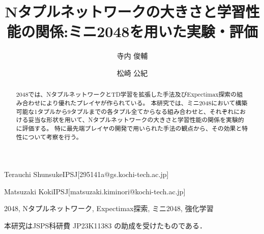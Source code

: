 \documentclass[submit,techrep,noauthor,platex,dvipdfmx]{ipsj}
\begin{document}
\title{Nタプルネットワークの大きさと学習性能の関係:ミニ2048を用いた実験・評価}

\etitle{}




\author{寺内 俊輔}{Terauchi Shunsuke}{IPSJ}[295141a@gs.kochi-tech.ac.jp]
\author{松崎 公紀}{Matsuzaki Koki}{IPSJ}[matsuzaki.kiminori@kochi-tech.ac.jp]

\begin{abstract}
    2048では、NタプルネットワークとTD学習を拡張した手法及びExpectimax探索の組み合わせにより優れたプレイヤが作られている。
    本研究では、ミニ2048において構築可能な1タプルから9タプルまでの各タプル全てからなる組み合わせと、それぞれにおける妥当な形状を用いて、Nタプルネットワークの大きさと学習性能の関係を実験的に評価する。
    特に最先端プレイヤの開発で用いられた手法の観点から、その効果と特性について考察を行う。
\end{abstract}


\begin{jkeyword}
2048, Nタプルネットワーク, Expectimax探索, ミニ2048, 強化学習
\end{jkeyword}


\maketitle







\begin{acknowledgment}
    本研究はJSPS科研費 JP23K11383 の助成を受けたものである．
\end{acknowledgment}

\def\newblock{}

% 


\end{document}
